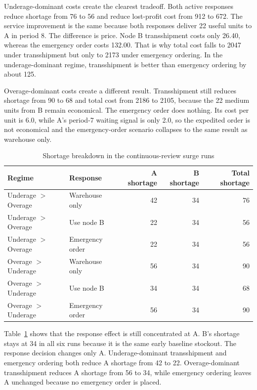 \documentclass[11pt]{article}
\begin{document}
Underage-dominant costs create the clearest tradeoff. Both active responses reduce shortage from 76 to 56 and reduce lost-profit cost from 912 to 672. The service improvement is the same because both responses deliver 22 useful units to A in period 8. The difference is price. Node B transshipment costs only 26.40, whereas the emergency order costs 132.00. That is why total cost falls to 2047 under transshipment but only to 2173 under emergency ordering. In the underage-dominant regime, transshipment is better than emergency ordering by about 125.

Overage-dominant costs create a different result. Transshipment still reduces shortage from 90 to 68 and total cost from 2186 to 2105, because the 22 medium units from B remain economical. The emergency order does nothing. Its cost per unit is 6.0, while A's period-7 waiting signal is only 2.0, so the expedited order is not economical and the emergency-order scenario collapses to the same result as warehouse only.

\begin{table}[H]
\centering
\caption{Shortage breakdown in the continuous-review surge runs}
\label{tab:shortage-breakdown}
\begin{tabular}{llrrr}
\toprule
Regime & Response & A shortage & B shortage & Total shortage \\
\midrule
Underage $>$ Overage & Warehouse only & 42 & 34 & 76 \\
Underage $>$ Overage & Use node B & 22 & 34 & 56 \\
Underage $>$ Overage & Emergency order & 22 & 34 & 56 \\
Overage $>$ Underage & Warehouse only & 56 & 34 & 90 \\
Overage $>$ Underage & Use node B & 34 & 34 & 68 \\
Overage $>$ Underage & Emergency order & 56 & 34 & 90 \\
\bottomrule
\end{tabular}
\end{table}

Table~\ref{tab:shortage-breakdown} shows that the response effect is still concentrated at A. B's shortage stays at 34 in all six runs because it is the same early baseline stockout. The response decision changes only A. Underage-dominant transshipment and emergency ordering both reduce A shortage from 42 to 22. Overage-dominant transshipment reduces A shortage from 56 to 34, while emergency ordering leaves A unchanged because no emergency order is placed.
\end{document}
